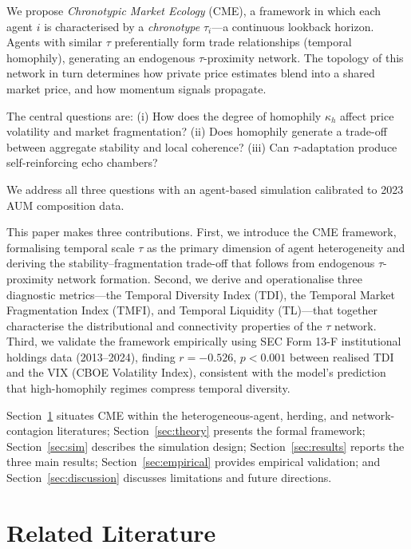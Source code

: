 \documentclass[10pt,twocolumn]{article}
\begin{document}
We propose \emph{Chronotypic Market Ecology} (CME), a framework in which
each agent $i$ is characterised by a \emph{chronotype} $\tau_i$---a
continuous lookback horizon.  Agents with similar $\tau$ preferentially
form trade relationships (temporal homophily), generating an endogenous
$\tau$-proximity network.  The topology of this network in turn determines
how private price estimates blend into a shared market price, and how
momentum signals propagate.

The central questions are: (i) How does the degree of homophily $\kappa_h$
affect price volatility and market fragmentation?
(ii) Does homophily generate a trade-off between aggregate stability and
local coherence?
(iii) Can $\tau$-adaptation produce self-reinforcing echo chambers?

We address all three questions with an agent-based simulation calibrated
to 2023 AUM composition data.

This paper makes three contributions. First, we introduce the CME framework,
formalising temporal scale $\tau$ as the primary dimension of agent
heterogeneity and deriving the stability--fragmentation trade-off that
follows from endogenous $\tau$-proximity network formation. Second, we
derive and operationalise three diagnostic metrics---the Temporal Diversity
Index (TDI), the Temporal Market Fragmentation Index (TMFI), and Temporal
Liquidity (TL)---that together characterise the distributional and
connectivity properties of the $\tau$ network. Third, we validate the
framework empirically using SEC Form 13-F institutional holdings data
(2013--2024), finding $r = -0.526$, $p < 0.001$ between realised TDI and the
VIX (CBOE Volatility Index), consistent with the model's prediction that high-homophily regimes
compress temporal diversity.

Section~\ref{sec:rellit} situates CME within the heterogeneous-agent,
herding, and network-contagion literatures; Section~\ref{sec:theory}
presents the formal framework; Section~\ref{sec:sim} describes the
simulation design; Section~\ref{sec:results} reports the three main
results; Section~\ref{sec:empirical} provides empirical validation; and
Section~\ref{sec:discussion} discusses limitations and future directions.

\section{Related Literature}
\label{sec:rellit}
\end{document}
